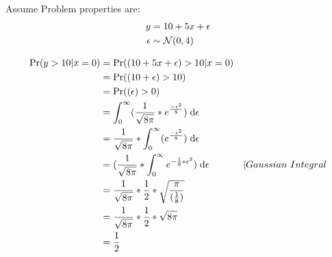 Assume Problem properties are: 
\begin{align*}
y &= 10 + 5x + \epsilon \\
\epsilon &\sim \mathcal{N}(0,4)
\end{align*}

\begin{align*}
\Pr(y>10|x = 0) &= \Pr((10 + 5x + \epsilon)>10|x = 0) \\
&= \Pr((10 + \epsilon)>10) \\
&= \Pr((\epsilon)>0) \\
&= \int_{0}^{\infty} (\frac{1}{\sqrt{8\pi}} * e^{\frac{ -\epsilon^2}{8}})\;\mathrm{d}\epsilon\\
&=\frac{1}{\sqrt{8\pi}} * \int_{0}^{\infty}  (e^{\frac{ -\epsilon^2}{8}})\;\mathrm{d}\epsilon\\
&=(\frac{1}{\sqrt{8\pi}} * \int_{0}^{\infty}  e^{-\frac{ 1}{8}* \epsilon^2})\;\mathrm{d}\epsilon &|Gaussian~Integral \\
&=\frac{1}{\sqrt{8\pi}} * \frac{1}{2}*\sqrt{\frac{\pi}{(\frac{1}{8})}} \\
&=\frac{1}{\sqrt{8\pi}} * \frac{1}{2}*\sqrt{8\pi} \\
&= \frac{1}{2}
\end{align*}
